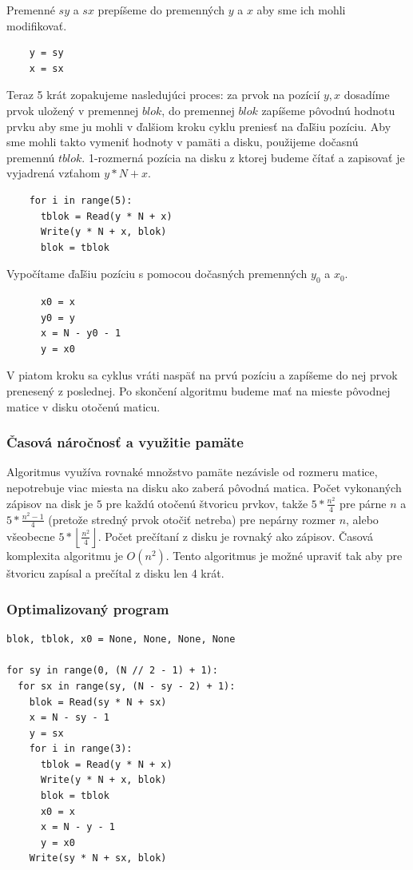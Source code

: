 \documentclass{article}
\begin{document}
Premenné $sy$ a $sx$ prepíšeme do premenných $y$ a $x$ aby sme ich mohli modifikovať.

\begin{verbatim}
    y = sy
    x = sx
\end{verbatim}

Teraz 5 krát zopakujeme nasledujúci proces: za prvok na pozícií $y, x$ dosadíme prvok uložený v premennej $blok$, do premennej $blok$ zapíšeme pôvodnú hodnotu prvku aby sme ju mohli v ďalšiom kroku cyklu preniesť na ďaľšiu pozíciu. Aby sme mohli takto vymeniť hodnoty v pamäti a disku, použijeme dočasnú premennú $tblok$. 1-rozmerná pozícia na disku z ktorej budeme čítať a zapisovať je vyjadrená vzťahom $y * N + x$.

\begin{verbatim}
    for i in range(5):
      tblok = Read(y * N + x)
      Write(y * N + x, blok)
      blok = tblok
\end{verbatim}

Vypočítame ďaľšiu pozíciu s pomocou dočasných premenných $y_0$ a $x_0$.

\begin{verbatim}
      x0 = x
      y0 = y
      x = N - y0 - 1
      y = x0
\end{verbatim}

V piatom kroku sa cyklus vráti naspäť na prvú pozíciu a zapíšeme do nej prvok prenesený z poslednej.
Po skončení algoritmu budeme mať na mieste pôvodnej matice v disku otočenú maticu.

\subsubsection*{Časová náročnosť a využitie pamäte}

Algoritmus využíva rovnaké množstvo pamäte nezávisle od rozmeru matice, nepotrebuje viac miesta na disku ako zaberá pôvodná matica. Počet vykonaných zápisov na disk je $5$ pre každú otočenú štvoricu prvkov, takže $5*\frac{n^2}{4}$ pre párne $n$ a $5*\frac{n^2 - 1}{4}$ (pretože stredný prvok otočiť netreba) pre nepárny rozmer $n$, alebo všeobecne $5*\left\lfloor\frac{n^2}{4}\right\rfloor$. Počet prečítaní z disku je rovnaký ako zápisov. Časová komplexita algoritmu je $O(n^2)$. Tento algoritmus je možné upraviť tak aby pre štvoricu zapísal a prečítal z disku len 4 krát.

\subsubsection*{Optimalizovaný program}

\begin{verbatim}
blok, tblok, x0 = None, None, None, None

for sy in range(0, (N // 2 - 1) + 1):
  for sx in range(sy, (N - sy - 2) + 1):
    blok = Read(sy * N + sx)
    x = N - sy - 1
    y = sx
    for i in range(3):
      tblok = Read(y * N + x)
      Write(y * N + x, blok)
      blok = tblok
      x0 = x
      x = N - y - 1
      y = x0
    Write(sy * N + sx, blok)
\end{verbatim}
\end{document}
